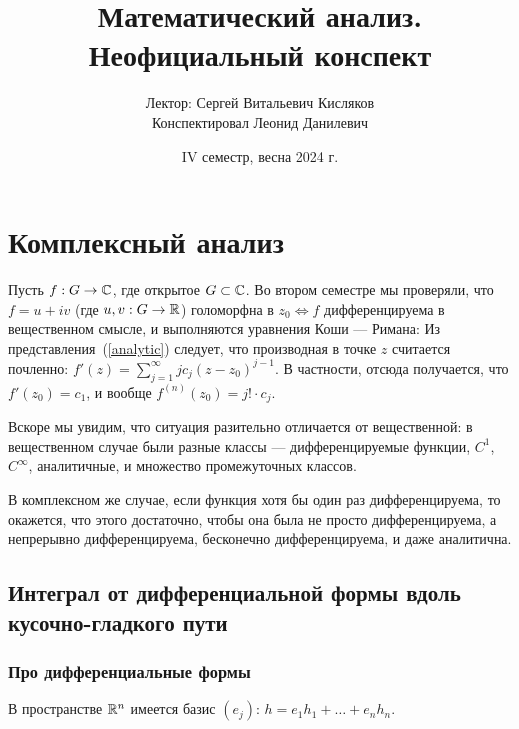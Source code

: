 \documentclass[a4paper]{report}
\date{IV семестр, весна 2024 г.}
\title{Математический анализ. Неофициальный конспект}
\author{Лектор: Сергей Витальевич Кисляков \\ Конспектировал Леонид Данилевич}
\begin{document}
    \maketitle
    \tableofcontents
    \newpage
    \setcounter{lection}{0}
    \chapter{Комплексный анализ}
    Пусть $f: G \rightarrow \mathbb{C}$, где открытое $G \subset \mathbb{C}$.
    Во втором семестре мы проверяли, что $f = u + iv$ (где $u, v: G \rightarrow \mathbb{R}$) голоморфна в $z_0 \iff f$ дифференцируема в вещественном смысле, и выполняются уравнения Коши --- Римана:
    Из представления~(\ref{analytic}) следует, что производная в точке $z$ считается почленно: $f'(z) = \sum\limits_{j = 1}^{\infty}j c_j (z - z_0)^{j - 1}$.
    В частности, отсюда получается, что $f'(z_0) = c_1$, и вообще $f^{(n)}(z_0) = j! \cdot c_j$.

    Вскоре мы увидим, что ситуация разительно отличается от вещественной: в вещественном случае были разные классы --- дифференцируемые функции, $C^1$, $C^\infty$, аналитичные, и множество промежуточных классов.

    В комплексном же случае, если функция хотя бы один раз дифференцируема, то окажется, что этого достаточно, чтобы она была не просто дифференцируема, а непрерывно дифференцируема, бесконечно дифференцируема, и даже аналитична.
    \section{Интеграл от дифференциальной формы вдоль кусочно-гладкого пути}
    \subsection{Про дифференциальные формы}
    В пространстве $\mathbb{R}^n$ имеется базис $(e_j)$: $h = e_1 h_1 + \dots + e_n h_n$.
\end{document}
